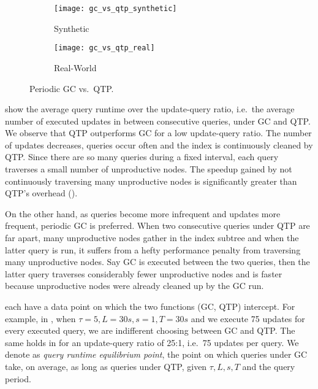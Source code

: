 \documentclass[abstracton,12pt]{scrartcl}
\theoremstyle{definition}
\begin{document}
\begin{figure}[h]
  \centering
  \begin{subfigure}{0.49\linewidth}
    \centering
    \caption{Synthetic}
    \texttt{[image: gc\_vs\_qtp\_synthetic]}
    \label{fig:gc_vs_qtp_synthetic}
  \end{subfigure}
  \begin{subfigure}{0.49\linewidth}
    \centering
    \caption{Real-World}
    \texttt{[image: gc\_vs\_qtp\_real]}
    \label{fig:gc_vs_qtp_real}
  \end{subfigure}
  \vspace{-0.5cm}
  \caption[Periodic GC vs.\ QTP]{Periodic GC vs.\ QTP.}
\end{figure}

 show the average query
runtime over the update-query ratio, i.e.\ the average number of executed
updates in between consecutive queries, under GC and QTP.
We observe that QTP outperforms GC for a low update-query ratio. 
The number of updates decreases, queries occur often and the index is continuously cleaned by QTP.
Since there are so many queries during a fixed interval, each query traverses
a small number of unproductive nodes. The speedup gained by not continuously traversing 
many unproductive nodes is significantly greater than QTP's overhead 
().

On the other hand, as queries become more infrequent and updates more frequent, 
periodic GC is preferred.
When two consecutive queries under QTP are far apart, many unproductive nodes
gather in the index subtree and when the latter query is run, it
suffers from a hefty performance penalty from traversing many unproductive nodes.
Say GC is executed between the two queries, then the latter query traverses
considerably fewer unproductive nodes and is faster because unproductive nodes
were already cleaned up by the GC run.

 each have a data point
on which the two functions (GC, QTP) intercept. For example, in
, when $\tau = 5, L = 30s, s = 1, T = 30s$ and
we execute 75 updates for every executed query, we are indifferent choosing between GC
and QTP. The same holds in  for an update-query ratio of 25:1,
i.e.\ 75 updates per query.
We denote as \textit{query runtime equilibrium point}, the point on which queries
under GC take, on average, as long as queries under QTP, given $\tau, L, s, T$
and the query period.
\end{document}
